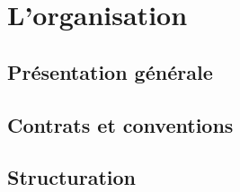 \section{L'organisation}
\subsection{Présentation générale}
\subsection{Contrats et conventions}
\subsection{Structuration}